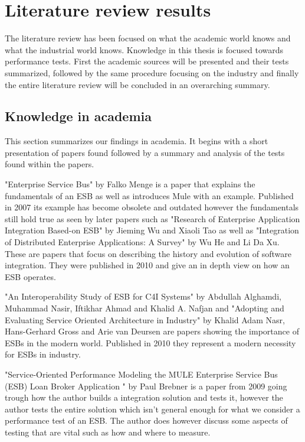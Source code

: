 ﻿\section{Literature review results}
\label{sec:litrev}

The literature review has been focused on what the academic world knows and what the industrial world knows. Knowledge in this thesis is focused towards performance tests.
First the academic sources will be presented and their tests summarized, followed by the same procedure focusing on the industry and finally the entire literature review will be concluded in an overarching summary.

\subsection{Knowledge in academia}
\label{sec:academia_section}
This section summarizes our findings in academia. It begins with a short presentation of papers found followed by a summary and analysis of the tests found within the papers.


"Enterprise Service Bus"\cite{falko07} by Falko Menge is a paper that explains the fundamentals of an ESB as well as introduces Mule with an example. Published in 2007 its example has become obsolete and outdated however the fundamentals still hold true as seen by later papers such as "Research of Enterprise Application Integration Based-on ESB" \cite{Jieming2010} by Jieming Wu and Xiaoli Tao as well as "Integration of Distributed Enterprise Applications: A Survey" \cite{HeIntegration} by Wu He and Li Da Xu. 
These are papers that focus on describing the history and evolution of software integration. They were published in 2010 and give an in depth view on how an ESB  operates.


"An Interoperability  Study  of ESB for C4I  Systems" \cite{Alghamdi2010} by Abdullah Alghamdi, Muhammad Nasir, Iftikhar Ahmad and Khalid A. Nafjan and  "Adopting and Evaluating Service Oriented Architecture in Industry" by Khalid Adam Nasr, Hans-Gerhard Gross and Arie van Deursen are papers showing the importance of ESBs in the modern world. Published in 2010 they represent a modern necessity for ESBs in industry.


"Service-Oriented Performance Modeling the MULE Enterprise Service Bus (ESB) Loan Broker Application " \cite{Brebner2009} by Paul Brebner is a paper from 2009 going trough how the author builds a integration solution and tests it, however the author tests the entire solution which isn't general enough for what we consider a performance test of an ESB. The author does however discuss some aspects of testing that are vital such as how and where to measure.

